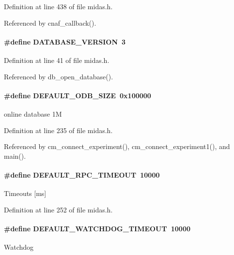 Definition at line 438 of file midas.h.

Referenced by cnaf\_\-callback().
\paragraph[{DATABASE\_\-VERSION}]{\setlength{\rightskip}{0pt plus 5cm}\#define DATABASE\_\-VERSION~3}\hfill\label{group__midasincludecode_ga56009b752c3ae8aa1235c777507e980b}


Definition at line 41 of file midas.h.

Referenced by db\_\-open\_\-database().
\paragraph[{DEFAULT\_\-ODB\_\-SIZE}]{\setlength{\rightskip}{0pt plus 5cm}\#define DEFAULT\_\-ODB\_\-SIZE~0x100000}\hfill\label{group__midasincludecode_gac5b414ae3a2f854b099c08f5e63e8671}
online database 1M 

Definition at line 235 of file midas.h.

Referenced by cm\_\-connect\_\-experiment(), cm\_\-connect\_\-experiment1(), and main().
\paragraph[{DEFAULT\_\-RPC\_\-TIMEOUT}]{\setlength{\rightskip}{0pt plus 5cm}\#define DEFAULT\_\-RPC\_\-TIMEOUT~10000}\hfill\label{group__midasincludecode_ga39d21da28bfcbf0caba6bd19ef551f36}
Timeouts \mbox{[}ms\mbox{]} 

Definition at line 252 of file midas.h.
\paragraph[{DEFAULT\_\-WATCHDOG\_\-TIMEOUT}]{\setlength{\rightskip}{0pt plus 5cm}\#define DEFAULT\_\-WATCHDOG\_\-TIMEOUT~10000}\hfill\label{group__midasincludecode_ga277afc8607c7a55aafffc11d69be143c}
Watchdog 

